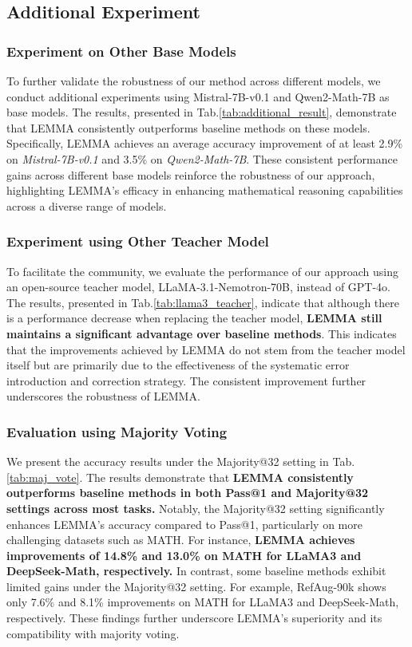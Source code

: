 \subsection{Additional Experiment}
\label{sec:additional_exp}

\subsubsection{Experiment on Other Base Models}
To further validate the robustness of our method across different models, we conduct additional experiments using Mistral-7B-v0.1 and Qwen2-Math-7B as base models. The results, presented in Tab.\ref{tab:additional_result}, demonstrate that LEMMA consistently outperforms baseline methods on these models. Specifically, LEMMA achieves an average accuracy improvement of at least 2.9\% on \textit{Mistral-7B-v0.1} and 3.5\% on \textit{Qwen2-Math-7B}. These consistent performance gains across different base models reinforce the robustness of our approach, highlighting LEMMA's efficacy in enhancing mathematical reasoning capabilities across a diverse range of models.

\subsubsection{Experiment using Other Teacher Model}

To facilitate the community, we evaluate the performance of our approach using an open-source teacher model, LLaMA-3.1-Nemotron-70B, instead of GPT-4o. The results, presented in Tab.\ref{tab:llama3_teacher}, indicate that although there is a performance decrease when replacing the teacher model, \textbf{LEMMA still maintains a significant advantage over baseline methods}. This indicates that the improvements achieved by LEMMA do not stem from the teacher model itself but are primarily due to the effectiveness of the systematic error introduction and correction strategy. The consistent improvement further underscores the robustness of LEMMA.

\subsubsection{Evaluation using Majority Voting}
\label{sec:maj_vote}

We present the accuracy results under the Majority@32 setting in Tab.\ref{tab:maj_vote}. The results demonstrate that \textbf{LEMMA consistently outperforms baseline methods in both Pass@1 and Majority@32 settings across most tasks.} Notably, the Majority@32 setting significantly enhances LEMMA's accuracy compared to Pass@1, particularly on more challenging datasets such as MATH. For instance, \textbf{LEMMA achieves improvements of 14.8\% and 13.0\% on MATH for LLaMA3 and DeepSeek-Math, respectively.} In contrast, some baseline methods exhibit limited gains under the Majority@32 setting. For example, RefAug-90k shows only 7.6\% and 8.1\% improvements on MATH for LLaMA3 and DeepSeek-Math, respectively. These findings further underscore LEMMA's superiority and its compatibility with majority voting.

